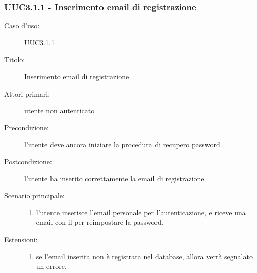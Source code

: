 \documentclass[casi-duso]{subfiles}
\begin{document}
\subsubsection{UUC3.1.1 - Inserimento email di registrazione}%
\label{subsub:UUC3.1.1utente}
\begin{description}
  \item[Caso d’uso:] UUC3.1.1
  \item[Titolo:] Inserimento email di registrazione
  \item[Attori primari:] utente non autenticato
  \item[Precondizione:] l'utente deve ancora iniziare la procedura di recupero password.
  \item[Postcondizione:] l'utente ha inserito correttamente la email di registrazione.
  \item[Scenario principale:]
        \begin{enumerate}
          \item l'utente inserisce l'email personale per l'autenticazione, e riceve una email con il  per reimpostare la password.
        \end{enumerate}
  \item[Estensioni:]
        \begin{enumerate}
          \item se l'email inserita non è registrata nel database, allora verrà segnalato un errore.
        \end{enumerate}
\end{description}

\end{document}
